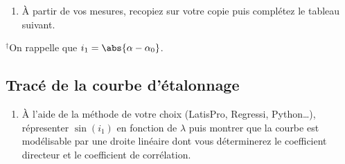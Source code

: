 \documentclass[../main/main.tex]{subfiles}
\begin{document}
\begin{enumerate}[label=\sqenumi]
  \item À partir de vos mesures, recopiez sur votre copie puis complétez le
    tableau suivant.
\end{enumerate}
\begin{table}[htbp]
  \centering
  \caption{Données à relever}
  \label{tab:raiesmes}
  \begin{threeparttable}
  \begin{tablenotes}[flushleft]
   $^\dag$On rappelle que $i_1 = \abs{\alpha-\alpha_0}$.
  \end{tablenotes}
  \end{threeparttable}
\end{table}

\subsection{Tracé de la courbe d'étalonnage}

\begin{enumerate}[label=\sqenumi, start=2]
  \item À l'aide de la méthode de votre choix (LatisPro, Regressi,
    Python…), répresenter
    $\sin(i_1)$ en fonction de $\lambda$ puis montrer que la courbe est
    modélisable par une droite linéaire dont vous déterminerez le coefficient
    directeur et le coefficient de corrélation.
\end{enumerate}
\end{document}
